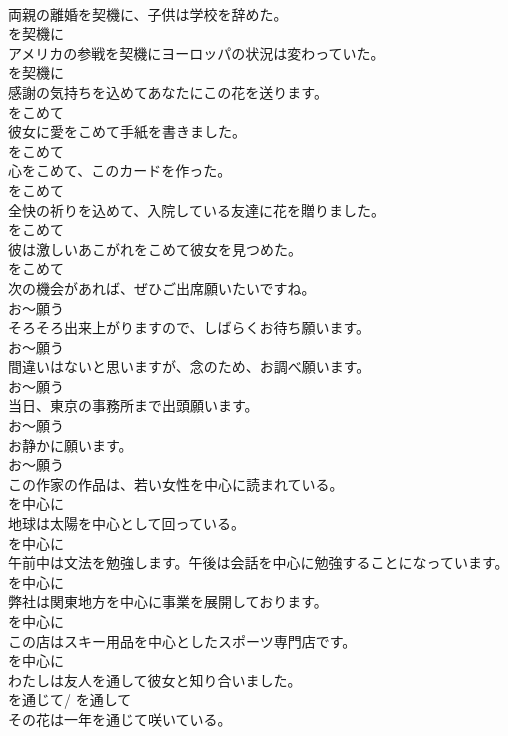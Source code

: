\documentclass[8pt]{extreport}
\begin{document}
\begin{CJK}{UTF8}{min}
\\	両親の離婚を契機に、子供は学校を辞めた。	
\\	を契機に	
\\	アメリカの参戦を契機にヨーロッパの状況は変わっていた。	
\\	を契機に	
\\	感謝の気持ちを込めてあなたにこの花を送ります。	
\\	をこめて	
\\	彼女に愛をこめて手紙を書きました。	
\\	をこめて	
\\	心をこめて、このカードを作った。	
\\	をこめて	
\\	全快の祈りを込めて、入院している友達に花を贈りました。	
\\	をこめて	
\\	彼は激しいあこがれをこめて彼女を見つめた。	
\\	をこめて	
\\	次の機会があれば、ぜひご出席願いたいですね。	
\\	お～願う	
\\	そろそろ出来上がりますので、しばらくお待ち願います。	
\\	お～願う	
\\	間違いはないと思いますが、念のため、お調べ願います。	
\\	お～願う	
\\	当日、東京の事務所まで出頭願います。	
\\	お～願う	
\\	お静かに願います。	
\\	お～願う	
\\	この作家の作品は、若い女性を中心に読まれている。	
\\	を中心に	
\\	地球は太陽を中心として回っている。	
\\	を中心に	
\\	午前中は文法を勉強します。午後は会話を中心に勉強することになっています。	
\\	を中心に	
\\	弊社は関東地方を中心に事業を展開しております。	
\\	を中心に	
\\	この店はスキー用品を中心としたスポーツ専門店です。	
\\	を中心に	
\\	わたしは友人を通して彼女と知り合いました。	
\\	を通じて/ を通して	
\\	その花は一年を通じて咲いている。	

\end{CJK}
\end{document}
